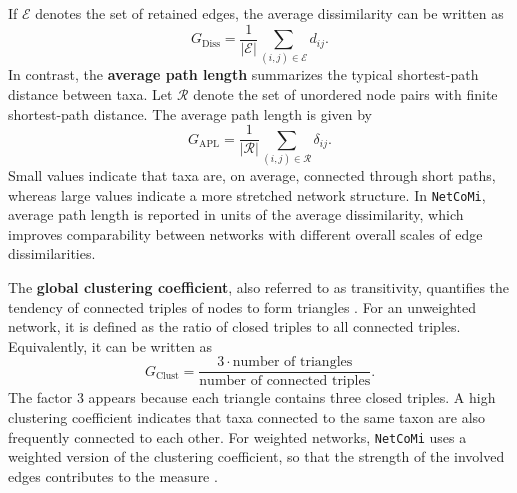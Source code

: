 If $\mathcal{E}$ denotes the set of retained edges, the average dissimilarity can be written as
\begin{equation}
\label{eq:5net:net_analysis:average_dissimilarity}
G_{\mathrm{Diss}} = \frac{1}{|\mathcal{E}|}\sum_{(i,j)\in\mathcal{E}} d_{ij}.
\end{equation}
In contrast, the \textbf{average path length} summarizes the typical shortest-path distance between taxa. Let $\mathcal{R}$ denote the set of unordered node pairs with finite shortest-path distance. The average path length is given by
\begin{equation}
\label{eq:5net:net_analysis:average_path_length}
G_{\mathrm{APL}} = \frac{1}{|\mathcal{R}|}\sum_{(i,j)\in \mathcal{R}} \delta_{ij}.
\end{equation}
Small values indicate that taxa are, on average, connected through short paths, whereas large values indicate a more stretched network structure. In \texttt{NetCoMi}, average path length is reported in units of the average dissimilarity, which improves comparability between networks with different overall scales of edge dissimilarities.

The \textbf{global clustering coefficient}, also referred to as transitivity, quantifies the tendency of connected triples of nodes to form triangles \citep{wasserman1994social}. For an unweighted network, it is defined as the ratio of closed triples to all connected triples. Equivalently, it can be written as
\begin{equation}
\label{eq:5net:net_analysis:clustering_coefficient}
G_{\mathrm{Clust}} = \frac{3 \cdot \text{number of triangles}}{\text{number of connected triples}}.
\end{equation}
The factor $3$ appears because each triangle contains three closed triples. A high clustering coefficient indicates that taxa connected to the same taxon are also frequently connected to each other. For weighted networks, \texttt{NetCoMi} uses a weighted version of the clustering coefficient, so that the strength of the involved edges contributes to the measure \citep{opsahl2009clustering}.

